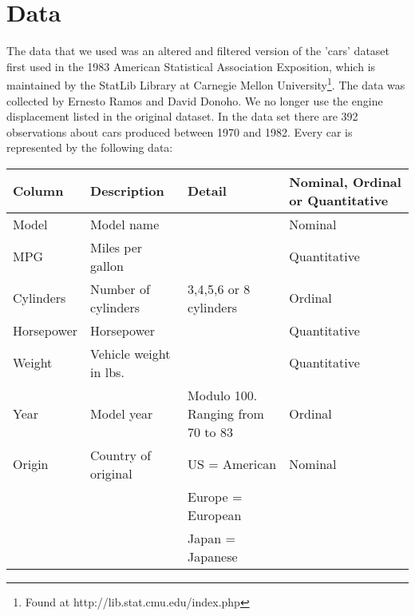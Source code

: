 \documentclass{article}
\begin{document}
\section{Data}
The data that we used was an altered and filtered version of the 'cars' dataset first used in the 1983 American Statistical Association Exposition, which is maintained by the StatLib Library at Carnegie Mellon University\footnote{Found at http://lib.stat.cmu.edu/index.php}. The data was collected by Ernesto Ramos and David Donoho. We no longer use the engine displacement listed in the original dataset. In the data set there are 392 observations about cars produced between 1970 and 1982. Every car is represented by the following data:
\begin{center}
	\begin{table}
	\begin{tabular}{| l | l | l | l |}
	\hline
	\textbf{Column} & \textbf{Description} & \textbf{Detail} & \textbf{Nominal, Ordinal or Quantitative} \\ \hline
	Model & Model name & & Nominal \\ \hline
	MPG & Miles per gallon & & Quantitative \\ \hline
	Cylinders & Number of cylinders & 3,4,5,6 or 8 cylinders & Ordinal\\ \hline
	Horsepower & Horsepower & & Quantitative \\ \hline
	Weight & Vehicle weight in lbs. & & Quantitative\\ \hline
	Year & Model year & Modulo 100. Ranging from 70 to 83 & Ordinal\\ \hline
	Origin & Country of original & US = American & Nominal \\&& Europe = European & \\ &&Japan = Japanese & \\ \hline
	\end{tabular}
	\label{table:data_desc}
	\end{table}
\end{center}
\end{document}
